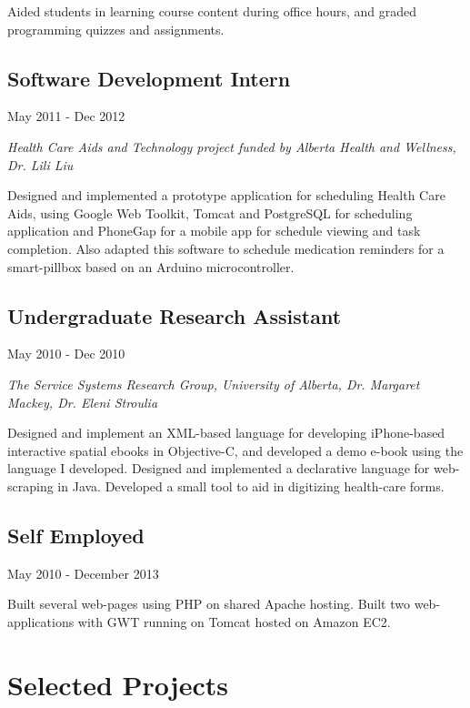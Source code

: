 \documentclass[10pt]{article}
\begin{document}
Aided students in learning course content during office hours, and graded programming quizzes and assignments.

\subsection*{Software Development Intern}
May 2011 - Dec 2012

\emph{Health Care Aids and Technology project funded by Alberta Health and Wellness, Dr. Lili Liu}
\vspace{\baselineskip}

Designed and implemented a prototype application for scheduling Health Care Aids, using Google Web Toolkit, Tomcat and PostgreSQL for scheduling application and PhoneGap for a mobile app for schedule viewing and task completion. Also adapted this software to schedule medication reminders for a smart-pillbox based on an Arduino microcontroller.

\subsection*{Undergraduate Research Assistant}
May 2010 - Dec 2010

\emph{The Service Systems Research Group, University of Alberta, Dr. Margaret Mackey, Dr. Eleni Stroulia}
\vspace{\baselineskip}

Designed and implement an XML-based language for developing iPhone-based interactive spatial ebooks in Objective-C, and developed a demo e-book using the language I developed. Designed and implemented a declarative language for web-scraping in Java. Developed a small tool to aid in digitizing health-care forms.



\subsection*{Self Employed}
May 2010 - December 2013
\vspace{\baselineskip}

Built several web-pages using PHP on shared Apache hosting. Built two web-applications with GWT running on Tomcat hosted on Amazon EC2.

\section*{Selected Projects}
\end{document}
